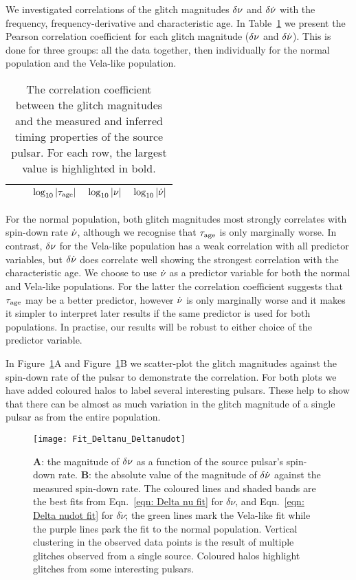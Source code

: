 \documentclass[../full_thesis/full_thesis.tex]{subfiles}
\newcommand{\thisdir}{../glitches_in_CGW}
\begin{document}
We investigated correlations of the
glitch magnitudes $\delta\nu$ and $\delta\dot{\nu}$ with the frequency,
frequency-derivative and characteristic age.
In Table~\ref{tab: correlation} we present the Pearson correlation coefficient
for each glitch magnitude ($\delta\nu$ and $\delta\dot{\nu}$).
This is done for three groups:
all the data together, then individually for the normal population and the
Vela-like population.
\begin{table}[htb]
\begin{tabular}{l|l|ccc}
&  & $\log_{10}|\tau_{\mathrm{age}}|$ & $\log_{10}|\nu|$ & $\log_{10}|\dot{\nu}|$ \\\hline

\end{tabular}
\caption{The correlation coefficient between the glitch
magnitudes and the measured and inferred timing properties of the source
pulsar. For each row, the largest value is highlighted in bold.}
\label{tab: correlation}
\end{table}
For the normal population, both glitch magnitudes most strongly correlates with
spin-down rate $\dot{\nu}$, although we recognise that $\tau_{\mathrm{age}}$ is only
marginally worse. In contrast, $\delta\nu$ for the Vela-like population has
a weak correlation with all predictor variables, but $\delta\dot{\nu}$ does
correlate well showing the strongest correlation with the characteristic age.
We choose to use $\dot{\nu}$ as a predictor variable for both the normal and
Vela-like populations. For the latter the correlation coefficient suggests that
$\tau_{\mathrm{age}}$ may be a better predictor, however $\dot{\nu}$ is only marginally worse
and it makes it simpler to interpret later results if the same predictor is
used for both populations. In practise, our results will be robust to either
choice of the predictor variable.

In Figure~\ref{fig: extrapolation fit}A  and Figure~\ref{fig: extrapolation fit}B
we scatter-plot
the glitch magnitudes against the spin-down rate of the pulsar to demonstrate the
correlation. For both plots we have added coloured
halos to label several interesting pulsars. These help to show that
there can be almost as much variation in the
glitch magnitude of a single pulsar as from the entire population.
\begin{figure}[htb]
\centering
\texttt{[image: Fit\_Deltanu\_Deltanudot]}
\caption{\textbf{A}: the magnitude of $\delta\nu$ as a function of the source
pulsar's spin-down rate. \textbf{B}: the absolute value of the magnitude of
$\delta\dot{\nu}$ against the measured spin-down rate. The coloured lines and shaded
bands are the best fits from Eqn.~\eqref{eqn: Delta nu fit} for $\delta\nu$,
and Eqn.~\eqref{eqn: Delta nudot fit} for $\delta \dot{\nu}$; the green lines
mark the Vela-like fit while the purple lines park the fit to the normal population.
Vertical clustering in the observed data points is the
result of multiple glitches observed from a single source. Coloured halos
highlight glitches from some interesting pulsars.}
\label{fig: extrapolation fit}
\end{figure}
\end{document}
